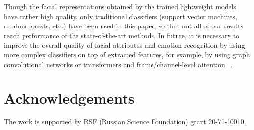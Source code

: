 \documentclass[runningheads]{llncs}
\begin{document}
Though the facial representations obtained by the trained lightweight models have rather high quality, only traditional classifiers (support vector machines, random forests, etc.) have been used in this paper, so that not all of our results reach performance of the state-of-the-art methods. In future, it is necessary to improve the overall quality of facial attributes and emotion recognition by using more complex classifiers on top of extracted features, for example, by using graph convolutional networks or transformers and frame/channel-level attention ~\cite{maslov2020online}.

\section*{Acknowledgements} The work is supported by RSF (Russian Science Foundation) grant 20-71-10010.



\end{document}
